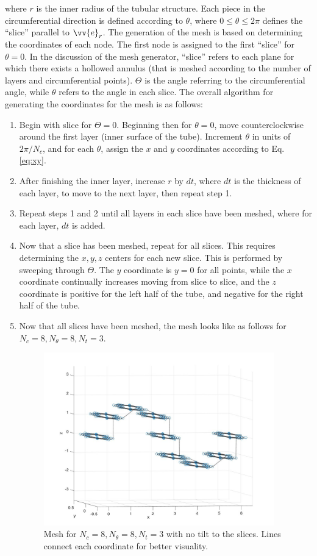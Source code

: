 \documentclass[10pt]{article}
\begin{document}
where \(r\) is the inner radius of the tubular structure. Each piece in the circumferential direction is defined according to \(\theta\), where \(0\leq\theta\leq2\pi\) defines the ``slice'' parallel to \(\vv{e}_r\). The generation of the mesh is based on determining the coordinates of each node. The first node is assigned to the first ``slice'' for \(\theta=0\). In the discussion of the mesh generator, ``slice'' refers to each plane for which there exists a hollowed annulus (that is meshed according to the number of layers and circumferential points). \(\Theta\) is the angle referring to the circumferential angle, while \(\theta\) refers to the angle in each slice. The overall algorithm for generating the coordinates for the mesh is as follows:

\begin{enumerate}
\item Begin with slice for \(\Theta=0\). Beginning then for \(\theta=0\), move counterclockwise around the first layer (inner surface of the tube). Increment \(\theta\) in units of \(2\pi/N_c\), and for each \(\theta\), assign the \(x\) and \(y\) coordinates according to Eq. \eqref{eq:xy}. 
\item After finishing the inner layer, increase \(r\) by \(dt\), where \(dt\) is the thickness of each layer, to move to the next layer, then repeat step 1. 
\item Repeat steps 1 and 2 until all layers in each slice have been meshed, where for each layer, \(dt\) is added. 
\item Now that a slice has been meshed, repeat for all slices. This requires determining the \(x,y,z\) centers for each new slice. This is performed by sweeping through \(\Theta\). The \(y\) coordinate is \(y=0\) for all points, while the \(x\) coordinate continually increases moving from slice to slice, and the \(z\) coordinate is positive for the left half of the tube, and negative for the right half of the tube. 
\item Now that all slices have been meshed, the mesh looks like as follows for \(N_c=8, N_\theta=8, N_t=3\). 

\begin{figure}[H]
  \centering
  \includegraphics[width=10cm]{NoTilt.jpg}
  \caption{Mesh for \(N_c=8, N_\theta=8, N_t=3\) with no tilt to the slices. Lines connect each coordinate for better visuality.}
\end{figure}


\end{enumerate}
\end{document}
